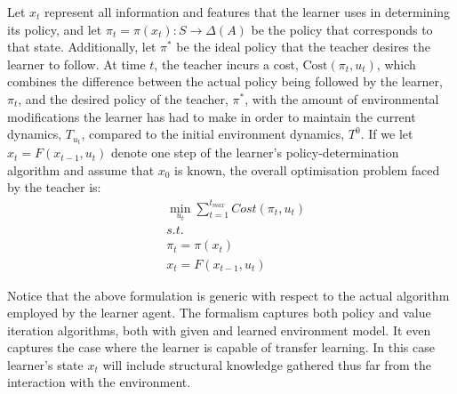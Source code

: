 Let $x_t$ represent all information and features that the learner uses
in determining its policy, and let
$\pi_t=\pi(x_t):S\rightarrow\Delta(A)$ be the policy that corresponds
to that state.  Additionally, let $\pi^*$ be the ideal policy that the
teacher desires the learner to follow.  At time $t$, the teacher
incurs a cost, $\mathrm{Cost}(\pi_t,u_t)$, which combines the
difference between the actual policy being followed by the learner,
$\pi_t$, and the desired policy of the teacher, $\pi^*$, with the
amount of environmental modifications the learner has had to make in
order to maintain the current dynamics, $T_{u_t}$, compared to the
initial environment dynamics, $T^0$. If we let $x_t=F(x_{t-1},u_t)$
denote one step of the learner's policy-determination algorithm and
assume that $x_0$ is known, the overall optimisation problem faced by
the teacher is:
\begin{eqnarray*}
&\min\limits_{u_t}\sum\limits_{t=1}^{t_{max}}Cost(\pi_t,u_t)\\
&s.t.\\
&\pi_t=\pi(x_t)\\
&x_t=F(x_{t-1},u_t)
\end{eqnarray*}




Notice that the above formulation is generic with respect to the
actual algorithm employed by the learner agent. The formalism captures
both policy and value iteration algorithms, both with given and
learned environment model. It even captures the case where the learner
is capable of transfer learning. In this case learner's state $x_t$
will include structural knowledge gathered thus far from the
interaction with the environment. 

